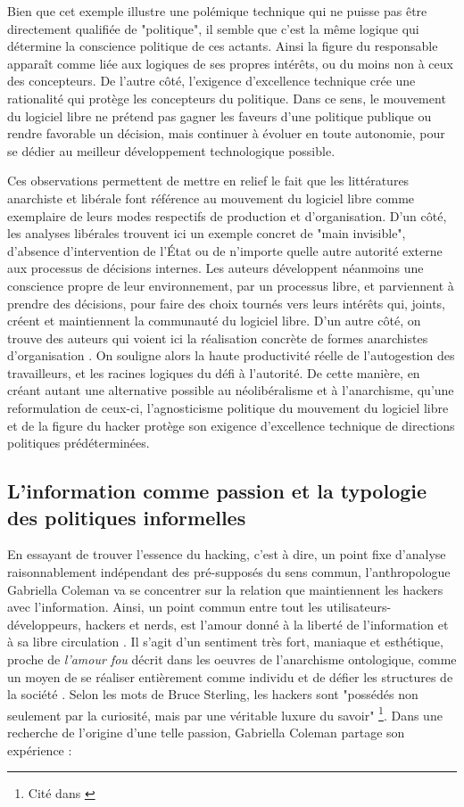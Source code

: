 Bien que cet exemple illustre une polémique technique qui ne puisse pas être directement qualifiée de "politique", il semble que c'est la même logique qui détermine la conscience politique de ces actants. Ainsi la figure du responsable apparaît comme liée aux logiques de ses propres intérêts, ou du moins non à ceux des concepteurs. De l'autre côté, l'exigence d'excellence technique crée une rationalité qui protège les concepteurs du politique. Dans ce sens, le mouvement du logiciel libre ne prétend pas gagner les faveurs d'une politique publique ou rendre favorable un décision, mais continuer à évoluer en toute autonomie, pour se dédier au meilleur développement technologique possible.

Ces observations permettent de mettre en relief le fait que les littératures anarchiste et libérale font référence au mouvement du logiciel libre comme exemplaire de leurs modes respectifs de production et d'organisation. D'un côté, les analyses libérales trouvent ici un exemple concret de "main invisible", d'absence d'intervention de l'\'Etat ou de n'importe quelle autre autorité externe aux processus de décisions internes. Les auteurs développent néanmoins une conscience propre de leur environnement, par un processus libre, et parviennent à prendre des décisions, pour faire des choix tournés vers leurs intérêts qui, joints, créent et maintiennent la communauté du logiciel libre. D'un autre côté, on trouve des auteurs qui voient ici la réalisation concrète de formes anarchistes d'organisation \citep{Moglen1999, Gross2007}. On souligne alors la haute productivité réelle de l'autogestion des travailleurs, et les racines logiques du défi à l'autorité. De cette manière, en créant autant une alternative possible au néolibéralisme et à l'anarchisme, qu'une reformulation de ceux-ci, l'agnosticisme politique du mouvement du logiciel libre et de la figure du hacker protège son exigence d'excellence technique de directions politiques prédéterminées.

\subsection{L'information comme passion et la typologie des politiques informelles} \label{2.2.2}

En essayant de trouver l'essence du hacking, c'est à dire, un point fixe d'analyse raisonnablement indépendant des pré-supposés du sens commun, l'anthropologue Gabriella Coleman va se concentrer sur la relation que maintiennent les hackers avec l'information. Ainsi, un point commun entre tout les utilisateurs-développeurs, hackers et nerds, est l'amour donné à la liberté de l'information et à sa libre circulation \citep{Coleman2003}. Il s'agit d'un sentiment très fort, maniaque et esthétique, proche de \emph{l'amour fou} décrit dans les oeuvres de l'anarchisme ontologique, comme un moyen de se réaliser entièrement comme individu et de défier les structures de la société \citep{Bey1985, Bey1991}. Selon les mots de Bruce Sterling, les hackers sont "possédés non seulement par la curiosité, mais par une véritable luxure du savoir" \footnote{Cité dans \citep{Coleman2003}}. Dans une recherche de l'origine d'une telle passion, Gabriella Coleman partage son expérience :

